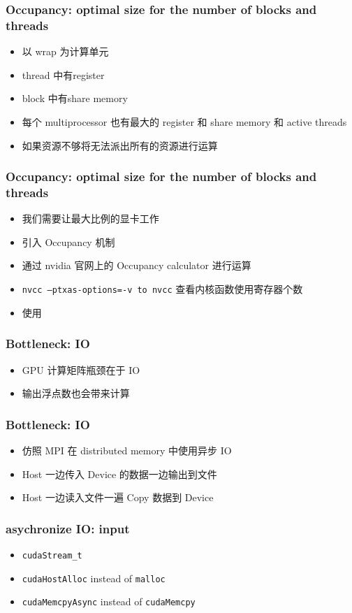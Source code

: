 \begin{frame}
    \frametitle{Occupancy: optimal size for the number of blocks and threads}
    \begin{itemize}
        \item 以 wrap 为计算单元
        \item thread 中有register
        \item block 中有share memory
        \item 每个 multiprocessor 也有最大的 register 和 share memory 和  active threads
        \item 如果资源不够将无法派出所有的资源进行运算
    \end{itemize}
\end{frame}

\begin{frame}
    \frametitle{Occupancy: optimal size for the number of blocks and threads}
    \begin{itemize}
        \item 我们需要让最大比例的显卡工作
        \item 引入 Occupancy 机制
        \item 通过 nvidia 官网上的 Occupancy calculator 进行运算
        \item \texttt{nvcc --ptxas-options=-v to nvcc} 查看内核函数使用寄存器个数
        \item 使用 \texttt{}
    \end{itemize}
\end{frame}

\begin{frame}
    \frametitle{Bottleneck: IO}
    \begin{itemize}
        \item GPU 计算矩阵瓶颈在于 IO
        \item 输出浮点数也会带来计算
    \end{itemize}
\end{frame}

\begin{frame}
    \frametitle{Bottleneck: IO}
    \begin{itemize}
        \item 仿照 MPI 在 distributed memory 中使用异步 IO
        \item Host 一边传入 Device 的数据一边输出到文件
        \item Host 一边读入文件一遍 Copy 数据到 Device
    \end{itemize}
\end{frame}

\begin{frame}
    \frametitle{asychronize IO: input}
    \begin{itemize}
        \item \texttt{cudaStream\_t}
        \item \texttt{cudaHostAlloc} instead of \texttt{malloc}
        \item \texttt{cudaMemcpyAsync} instead of \texttt{cudaMemcpy}
    \end{itemize}
\end{frame}

